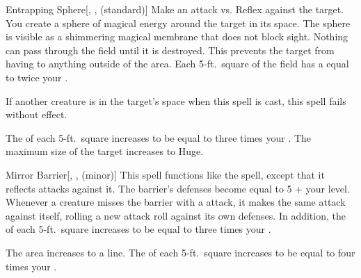 \lowercase{\hypertarget{spell:Entrapping Sphere}{}}\label{spell:Entrapping Sphere}
\begin{freeability}[Rank 4]{\hypertarget{spell:Entrapping Sphere}{Entrapping Sphere}}[, ,  (standard)]
Make an attack vs. Reflex against the target.
\hit You create a sphere of magical energy around the target in its space.
The sphere is visible as a shimmering magical membrane that does not block sight.
Nothing can pass through the field until it is destroyed.
This prevents the target from having  to anything outside of the area.
Each 5-ft.\ square of the field has a  equal to twice your .

If another creature is in the target's space when this spell is cast, this spell fails without effect.

\rankline
{} The  of each 5-ft.\ square increases to be equal to three times your .
 The maximum size of the target increases to Huge.
\end{freeability}
\vspace{0.25em}



\lowercase{\hypertarget{spell:Mirror Barrier}{}}\label{spell:Mirror Barrier}
\begin{freeability}[Rank 4]{\hypertarget{spell:Mirror Barrier}{Mirror Barrier}}[, ,  (minor)]
\targetrule
This spell functions like the  spell, except that it reflects  attacks against it.
The barrier's defenses become equal to 5 + your level.
Whenever a creature misses the barrier with a  attack, it makes the same attack against itself, rolling a new attack roll against its own defenses.
In addition, the  of each 5-ft.\ square increases to be equal to three times your .

 The area increases to a \arealarge line.
 The  of each 5-ft.\ square increases to be equal to four times your .
\end{freeability}
\vspace{0.25em}



